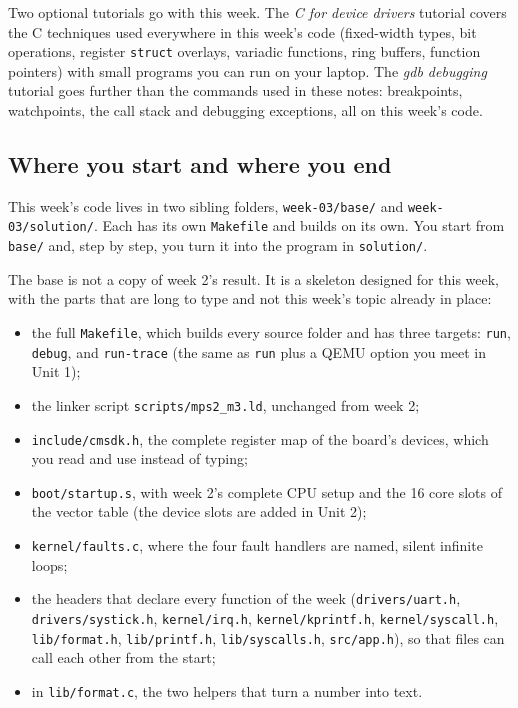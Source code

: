 Two optional tutorials go with this week. The \textit{C for device drivers} tutorial covers the C techniques used everywhere in this week's code (fixed-width types, bit operations, register \texttt{struct} overlays, variadic functions, ring buffers, function pointers) with small programs you can run on your laptop. The \textit{gdb debugging} tutorial goes further than the commands used in these notes: breakpoints, watchpoints, the call stack and debugging exceptions, all on this week's code.

\subsection*{Where you start and where you end}

This week's code lives in two sibling folders, \texttt{week-03/base/} and \texttt{week-03/solution/}. Each has its own \texttt{Makefile} and builds on its own. You start from \texttt{base/} and, step by step, you turn it into the program in \texttt{solution/}.

The base is not a copy of week 2's result. It is a skeleton designed for this week, with the parts that are long to type and not this week's topic already in place:

\begin{itemize}
    \item the full \texttt{Makefile}, which builds every source folder and has three targets: \texttt{run}, \texttt{debug}, and \texttt{run-trace} (the same as \texttt{run} plus a QEMU option you meet in Unit 1);
    \item the linker script \texttt{scripts/mps2\_m3.ld}, unchanged from week 2;
    \item \texttt{include/cmsdk.h}, the complete register map of the board's devices, which you read and use instead of typing;
    \item \texttt{boot/startup.s}, with week 2's complete CPU setup and the 16 core slots of the vector table (the device slots are added in Unit 2);
    \item \texttt{kernel/faults.c}, where the four fault handlers are named, silent infinite loops;
    \item the headers that declare every function of the week (\texttt{drivers/uart.h}, \texttt{drivers/systick.h}, \texttt{kernel/irq.h}, \texttt{kernel/kprintf.h}, \texttt{kernel/syscall.h}, \texttt{lib/format.h}, \texttt{lib/printf.h}, \texttt{lib/syscalls.h}, \texttt{src/app.h}), so that files can call each other from the start;
    \item in \texttt{lib/format.c}, the two helpers that turn a number into text.
\end{itemize}

